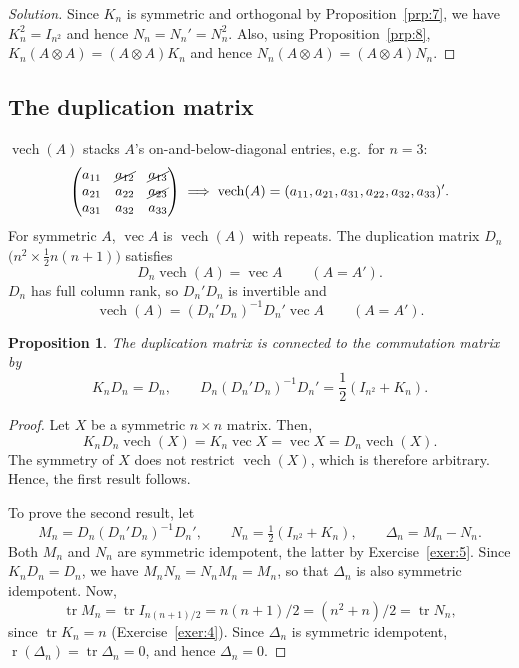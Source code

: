 \documentclass[14pt]{extarticle}
\theoremstyle{plain}
\newtheorem{proposition}{Proposition}
\theoremstyle{definition}
\theoremstyle{remark}
\newenvironment{solution}{%
  \begin{proof}[Solution]%
}{%
  \end{proof}%
}
\DeclareMathOperator{\tr}{tr}
\DeclareMathOperator{\vech}{vech}
\DeclareMathOperator{\avec}{vec}
\DeclareMathOperator{\rank}{r}
\begin{document}
\begin{solution}
Since $K_n$ is symmetric and orthogonal by Proposition~\ref{prp:7}, we have $K_n^2 = I_{n^2}$ and hence $N_n = N_n' = N_n^2$. Also, using Proposition~\ref{prp:8}, $K_n(A \otimes A) = (A \otimes A)K_n$ and hence $N_n(A \otimes A) = (A \otimes A)N_n$.
\end{solution}

\subsection{The duplication matrix}\label{sec:2.6}

$\vech(A)$ stacks $A$'s on-and-below-diagonal entries, e.g.\ for $n=3$:
\[
\begin{pmatrix}
a_{11} & \cancel{a_{12}} & \cancel{a_{13}} \\
a_{21} & a_{22} & \cancel{a_{23}} \\
a_{31} & a_{32} & a_{33}
\end{pmatrix}
\;\Longrightarrow\;
\vech(A) = (a_{11}, a_{21}, a_{31}, a_{22}, a_{32}, a_{33})'.
\]
For symmetric $A$, $\avec A$ is $\vech(A)$ with repeats. The duplication matrix $D_n$ $\bigl(n^2 \times \tfrac{1}{2}n(n+1)\bigr)$ satisfies
\begin{equation}\label{eq:5}
D_n \vech(A) = \avec A \qquad (A = A').
\end{equation}
$D_n$ has full column rank, so $D_n'D_n$ is invertible and
\begin{equation}\label{eq:6}
\vech(A) = (D_n'D_n)^{-1} D_n' \avec A \qquad (A = A').
\end{equation}

\begin{proposition}\label{prp:9}
The duplication matrix is connected to the commutation matrix by
\[
K_n D_n = D_n, \qquad
D_n (D_n'D_n)^{-1} D_n' = \frac{1}{2}(I_{n^2} + K_n).
\]
\end{proposition}

\begin{proof}
Let $X$ be a symmetric $n \times n$ matrix. Then,
\[
K_n D_n \vech(X) = K_n \avec X = \avec X = D_n \vech(X).
\]
The symmetry of $X$ does not restrict $\vech(X)$, which is therefore arbitrary. Hence, the first result follows.

To prove the second result, let
\[
M_n = D_n(D_n'D_n)^{-1}D_n', \qquad N_n = \tfrac{1}{2}(I_{n^2} + K_n), \qquad \Delta_n = M_n - N_n.
\]
Both $M_n$ and $N_n$ are symmetric idempotent, the latter by Exercise~\ref{exer:5}. Since $K_n D_n = D_n$, we have $M_n N_n = N_n M_n = M_n$, so that $\Delta_n$ is also symmetric idempotent.
Now,
\[
\tr M_n = \tr I_{n(n+1)/2} = n(n+1)/2 = (n^2 + n)/2 = \tr N_n,
\]
since $\tr K_n = n$ (Exercise~\ref{exer:4}). Since $\Delta_n$ is symmetric idempotent, $\rank(\Delta_n) = \tr \Delta_n = 0$, and hence $\Delta_n = 0$.
\end{proof}
\end{document}
